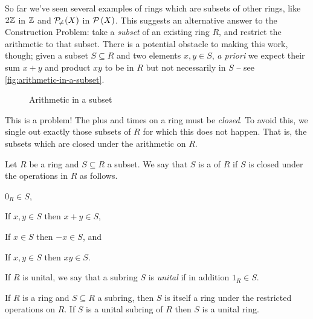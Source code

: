 So far we've seen several examples of rings which are subsets of other rings, like \(2\mathbb{Z}\) in \(\mathbb{Z}\) and \(\mathcal{P}_{\!\neq\!}\left(X\right)\) in \(\mathcal{P}\left(X\right)\).
This suggests an alternative answer to the Construction Problem: take a \emph{subset} of an existing ring \(R\), and restrict the arithmetic to that subset.
There is a potential obstacle to making this work, though; given a subset \(S \subseteq R\) and two elements \(x,y \in S\), \emph{a priori} we expect their sum \(x+y\) and product \(xy\) to be in \(R\) but not necessarily in \(S\) -- see \autoref{fig:arithmetic-in-a-subset}.
\begin{figure}[h!]
\begin{center}
\caption{Arithmetic in a subset \label{fig:arithmetic-in-a-subset}}
\end{center}
\end{figure}
This is a problem!
The plus and times on a ring must be \emph{closed}.
To avoid this, we single out exactly those subsets of \(R\) for which this does not happen.
That is, the subsets which are closed under the arithmetic on \(R\).

\begin{dfn}[Subring] \label{dfn:subring}
Let \(R\) be a ring and \(S \subseteq R\) a subset.
We say that \(S\) is a  of \(R\) if \(S\) is closed under the operations in \(R\) as follows.
\begin{proplist*}
\item \label{dfn:subring:zero} \(0_R \in S\),
\item \label{dfn:subring:plus} If \(x,y \in S\) then \(x+y \in S\),
\item \label{dfn:subring:neg} If \(x \in S\) then \(-x \in S\), and
\item \label{dfn:subring:times} If \(x,y \in S\) then \(xy \in S\).
\end{proplist*}
If \(R\) is unital, we say that a subring \(S\) is \emph{unital} if in addition \(1_R \in S\).
\end{dfn}

\begin{prop} \label{prop:subring-is-ring}
If \(R\) is a ring and \(S \subseteq R\) a subring, then \(S\) is itself a ring under the restricted operations on \(R\).
If \(S\) is a unital subring of \(R\) then \(S\) is a unital ring.
\end{prop}

